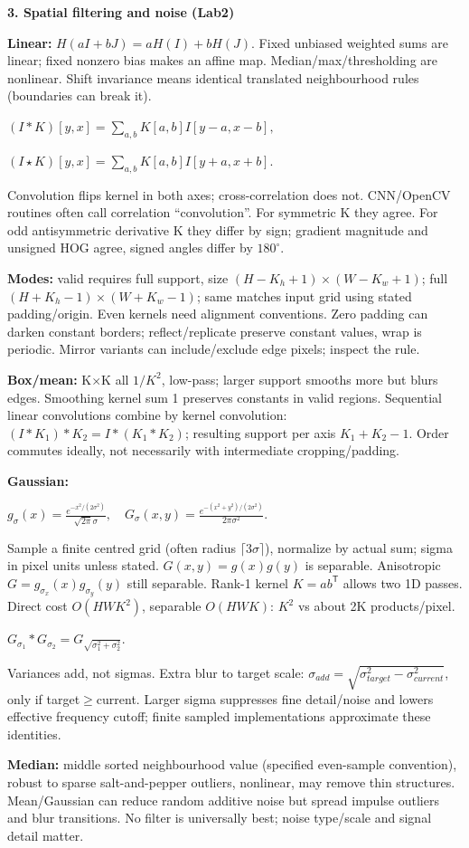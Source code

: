\documentclass[a4paper]{article}
\newcommand{\key}[1]{\textbf{#1}}
\newcommand{\Topic}[1]{\par\vspace{1.7pt}\noindent
  {\fontsize{7.7}{8.0}\selectfont\bfseries #1}\par\vspace{0.3pt}}
\newcommand{\eq}[1]{\par\noindent\mbox{\(\displaystyle #1\)}\par}
\newcommand{\trans}{^{\mathsf T}}
\newcounter{sheet}
\newcounter{sheetcolumn}
\newlength{\colwidth}
\newenvironment{sheetcol}[1][7.0]{\stepcounter{sheetcolumn}
  \begin{lrbox}{\columnbox}\begin{minipage}[t]{\colwidth}\vspace{0pt}
  \fontsize{#1}{\dimexpr#1pt+0.6pt\relax}\selectfont}
  {\end{minipage}\end{lrbox}
  \typeout{CV1COL|\thesheet|\thesheetcolumn|\the\dimexpr\ht\columnbox+\dp\columnbox\relax}
  \usebox{\columnbox}\ignorespacesafterend}
\begin{document}
\begin{sheetcol}[6.54]
\Topic{3. Spatial filtering and noise (Lab2)}
\key{Linear:} \(H(aI+bJ)=aH(I)+bH(J)\). Fixed unbiased weighted sums are linear; fixed nonzero bias makes an affine map. Median/max/thresholding are nonlinear. Shift invariance means identical translated neighbourhood rules (boundaries can break it).
\eq{(I*K)[y,x]=\sum_{a,b}K[a,b]I[y-a,x-b],}
\eq{(I\star K)[y,x]=\sum_{a,b}K[a,b]I[y+a,x+b].}
Convolution flips kernel in both axes; cross-correlation does not. CNN/OpenCV routines often call correlation ``convolution''. For symmetric K they agree. For odd antisymmetric derivative K they differ by sign; gradient magnitude and unsigned HOG agree, signed angles differ by \(180^\circ\).

\key{Modes:} valid requires full support, size \((H-K_h+1)\!\times\!(W-K_w+1)\); full \((H+K_h-1)\!\times\!(W+K_w-1)\); same matches input grid using stated padding/origin. Even kernels need alignment conventions. Zero padding can darken constant borders; reflect/replicate preserve constant values, wrap is periodic. Mirror variants can include/exclude edge pixels; inspect the rule.

\key{Box/mean:} K\(\times\)K all \(1/K^2\), low-pass; larger support smooths more but blurs edges. Smoothing kernel sum 1 preserves constants in valid regions. Sequential linear convolutions combine by kernel convolution: \((I*K_1)*K_2=I*(K_1*K_2)\); resulting support per axis \(K_1+K_2-1\). Order commutes ideally, not necessarily with intermediate cropping/padding.

\key{Gaussian:}
\eq{g_\sigma(x)=\frac{e^{-x^2/(2\sigma^2)}}{\sqrt{2\pi}\sigma},\quad
 G_\sigma(x,y)=\frac{e^{-(x^2+y^2)/(2\sigma^2)}}{2\pi\sigma^2}.}
Sample a finite centred grid (often radius \(\lceil3\sigma\rceil\)), normalize by actual sum; sigma in pixel units unless stated. \(G(x,y)=g(x)g(y)\) is separable. Anisotropic \(G=g_{\sigma_x}(x)g_{\sigma_y}(y)\) still separable. Rank-1 kernel \(K=ab\trans\) allows two 1D passes. Direct cost \(O(HWK^2)\), separable \(O(HWK)\): \(K^2\) vs about 2K products/pixel.
\eq{G_{\sigma_1}*G_{\sigma_2}=G_{\sqrt{\sigma_1^2+\sigma_2^2}}.}
Variances add, not sigmas. Extra blur to target scale: \(\sigma_{add}=\sqrt{\sigma_{target}^2-\sigma_{current}^2}\), only if target\(\ge\)current. Larger sigma suppresses fine detail/noise and lowers effective frequency cutoff; finite sampled implementations approximate these identities.

\key{Median:} middle sorted neighbourhood value (specified even-sample convention), robust to sparse salt-and-pepper outliers, nonlinear, may remove thin structures. Mean/Gaussian can reduce random additive noise but spread impulse outliers and blur transitions. No filter is universally best; noise type/scale and signal detail matter.


\end{sheetcol}
\end{document}
